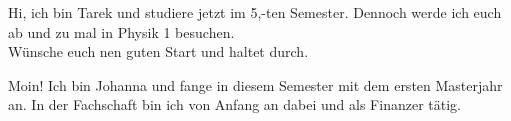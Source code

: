 \begin{multicols*}{2}
{Hi,
	ich bin Tarek und studiere jetzt im 5,-ten Semester. Dennoch werde ich euch ab und zu mal in Physik 1 besuchen. \\
	Wünsche euch nen guten Start und haltet durch.}	

\enlargethispage{2\baselineskip}


{Moin! Ich bin Johanna und fange in diesem Semester mit dem ersten Masterjahr an. In der Fachschaft bin ich von Anfang an dabei und als Finanzer tätig.
}





\end{multicols*}
